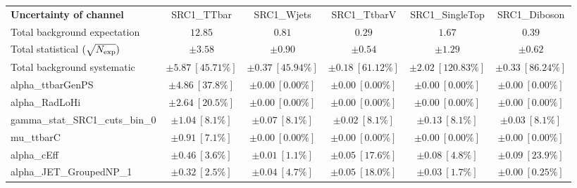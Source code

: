 
\begin{sidewaystable}
\begin{center}
\setlength{\tabcolsep}{0.0pc}
\begin{tabular*}{\textwidth}{@{\extracolsep{\fill}}lccccc}
\noalign{\smallskip}\hline\noalign{\smallskip}
{\bf Uncertainty of channel}                                    & SRC1\_TTbar            & SRC1\_Wjets            & SRC1\_TtbarV            & SRC1\_SingleTop            & SRC1\_Diboson            \\
\noalign{\smallskip}\hline\noalign{\smallskip}
Total background expectation             &  $12.85$        &  $0.81$        &  $0.29$        &  $1.67$        &  $0.39$       \\
\noalign{\smallskip}\hline\noalign{\smallskip}
Total statistical $(\sqrt{N_{\rm exp}})$              & $\pm 3.58$        & $\pm 0.90$        & $\pm 0.54$        & $\pm 1.29$        & $\pm 0.62$       \\
Total background systematic               & $\pm 5.87\ [45.71\%] $        & $\pm 0.37\ [45.94\%] $        & $\pm 0.18\ [61.12\%] $        & $\pm 2.02\ [120.83\%] $        & $\pm 0.33\ [86.24\%] $             \\
\noalign{\smallskip}\hline\noalign{\smallskip}
\noalign{\smallskip}\hline\noalign{\smallskip}
alpha\_ttbarGenPS         & $\pm 4.86\ [37.8\%] $          & $\pm 0.00\ [0.00\%] $          & $\pm 0.00\ [0.00\%] $          & $\pm 0.00\ [0.00\%] $          & $\pm 0.00\ [0.00\%] $       \\
alpha\_RadLoHi         & $\pm 2.64\ [20.5\%] $          & $\pm 0.00\ [0.00\%] $          & $\pm 0.00\ [0.00\%] $          & $\pm 0.00\ [0.00\%] $          & $\pm 0.00\ [0.00\%] $       \\
gamma\_stat\_SRC1\_cuts\_bin\_0         & $\pm 1.04\ [8.1\%] $          & $\pm 0.07\ [8.1\%] $          & $\pm 0.02\ [8.1\%] $          & $\pm 0.13\ [8.1\%] $          & $\pm 0.03\ [8.1\%] $       \\
mu\_ttbarC         & $\pm 0.91\ [7.1\%] $          & $\pm 0.00\ [0.00\%] $          & $\pm 0.00\ [0.00\%] $          & $\pm 0.00\ [0.00\%] $          & $\pm 0.00\ [0.00\%] $       \\
alpha\_cEff         & $\pm 0.46\ [3.6\%] $          & $\pm 0.01\ [1.1\%] $          & $\pm 0.05\ [17.6\%] $          & $\pm 0.08\ [4.8\%] $          & $\pm 0.09\ [23.9\%] $       \\
alpha\_JET\_GroupedNP\_1         & $\pm 0.32\ [2.5\%] $          & $\pm 0.04\ [4.7\%] $          & $\pm 0.05\ [18.0\%] $          & $\pm 0.03\ [1.7\%] $          & $\pm 0.00\ [0.25\%] $       \\

\end{tabular*}
\end{center}
\end{sidewaystable}
